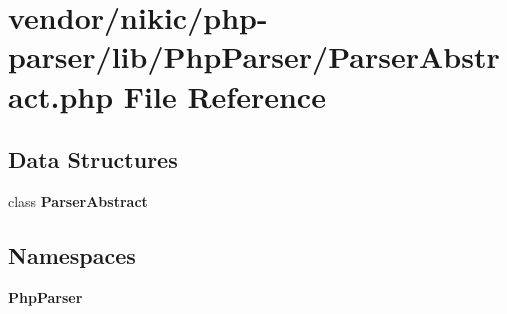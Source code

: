 \section{vendor/nikic/php-\/parser/lib/\+Php\+Parser/\+Parser\+Abstract.php File Reference}
\label{_parser_abstract_8php}
\subsection*{Data Structures}
\begin{DoxyCompactItemize}
\item 
class {\bf Parser\+Abstract}
\end{DoxyCompactItemize}
\subsection*{Namespaces}
\begin{DoxyCompactItemize}
\item 
 {\bf Php\+Parser}
\end{DoxyCompactItemize}

